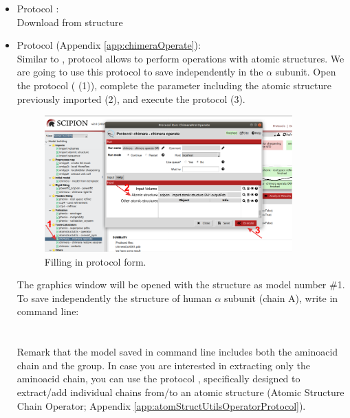   \begin{itemize}
    \item Protocol :\\
    Download from  structure \\
    
    \item Protocol  (Appendix \ref{app:chimeraOperate}):\\
    Similar to \chimera {}, \chimera {} protocol allows to perform operations with atomic structures. We are going to use this protocol to save independently in \scipion the  $\alpha$ subunit. Open the protocol  ( (1)), complete the parameter  including the atomic structure  previously imported (2), and execute the protocol (3).      
    
    \begin{figure}[H]
    \centering 
    \captionsetup{width=.7\linewidth} 
    \includegraphics[width=0.90\textwidth]{Images/Fig36}
    \caption{Filling in \chimera {} protocol form.}
    \label{fig:chimera_operate_protocol}
    \end{figure}
    
    The \chimera graphics window will be opened with the structure  as model number \#1. To save independently the structure of human  $\alpha$ subunit (chain A), write in \chimera command line:\\
    \\
    \\
    
    Remark that the model saved in \chimera command line includes both the aminoacid chain and the  group. In case you are interested in extracting only the aminoacid chain, you can use the protocol , specifically designed to extract/add individual chains from/to an atomic structure (Atomic Structure Chain Operator; Appendix \ref{app:atomStructUtilsOperatorProtocol}).
    

\end{itemize}
